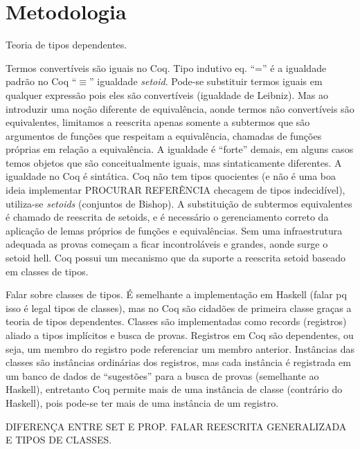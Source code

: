 \chapter{Metodologia}\label{chp:metodologia}
Teoria de tipos dependentes.

Termos convertíveis são iguais no Coq. Tipo indutivo eq. ``='' é a igualdade padrão no Coq ``$\equiv$'' igualdade \textit{setoid}. Pode-se substituir termos iguais em qualquer expressão pois eles são convertíveis (igualdade de Leibniz).
Mas ao introduzir uma noção diferente de equivalência, aonde termos não convertíveis são equivalentes, limitamos a reescrita
apenas somente a subtermos que são argumentos de funções que respeitam a equivalência, chamadas de funções próprias em relação a equivalência. A igualdade é ``forte'' demais, em alguns casos temos objetos que são conceitualmente iguais, mas sintaticamente diferentes. A igualdade no Coq é sintática. Coq não tem tipos quocientes (e não é uma boa ideia implementar PROCURAR REFERÊNCIA checagem de tipos indecidível), utiliza-se \textit{setoids} (conjuntos de Bishop). A substituição de subtermos equivalentes é chamado de reescrita de setoids, e é necessário o gerenciamento correto da aplicação de lemas próprios de funções e equivalências. Sem uma infraestrutura adequada as provas começam a ficar incontroláveis e grandes, aonde surge o setoid hell. Coq possui um mecanismo que da suporte a reescrita setoid baseado em classes de tipos.


Falar sobre classes de tipos. É semelhante a implementação em Haskell (falar pq isso é legal tipos de classes), mas no Coq são cidadões de primeira classe graças a teoria de tipos dependentes. Classes são implementadas como records (registros) aliado a tipos implícitos e busca de provas. Registros em Coq são dependentes, ou seja, um membro do registro pode referenciar um membro anterior. Instâncias das classes são instâncias ordinárias dos registros, mas cada instância é registrada em um banco de dados de ``sugestões'' para a busca de provas (semelhante ao Haskell), entretanto Coq permite mais de uma instância de classe (contrário do Haskell), pois pode-se ter mais de uma instância de um registro.

DIFERENÇA ENTRE SET E PROP. FALAR REESCRITA GENERALIZADA E TIPOS DE CLASSES.